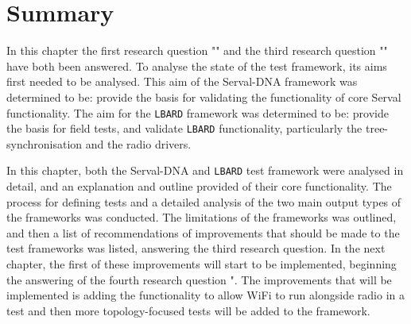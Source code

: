 \section{Summary}
In this chapter the first research question "\firstRQ" and the third research question "\thirdRQ" have both been answered.
To analyse the state of the test framework, its aims first needed to be analysed. 
This aim of the Serval-DNA framework was determined to be: provide the basis for validating the functionality of core Serval functionality.
The aim for the \texttt{LBARD} framework was determined to be: provide the basis for field tests, and validate \texttt{LBARD} functionality, particularly the tree-synchronisation and the radio drivers.

In this chapter, both the Serval-DNA and \texttt{LBARD} test framework were analysed in detail, and an explanation and outline provided of their core functionality.
The process for defining tests and a detailed analysis of the two main output types of the frameworks was conducted.
The limitations of the frameworks was outlined, and then a list of recommendations of improvements that should be made to the test frameworks was listed, answering the third research question.
In the next chapter, the first of these improvements will start to be implemented, beginning the answering of the fourth research question "\fourthRQ.
The improvements that will be implemented is adding the functionality to allow WiFi to run alongside radio in a test and then more topology-focused tests will be added to the framework.